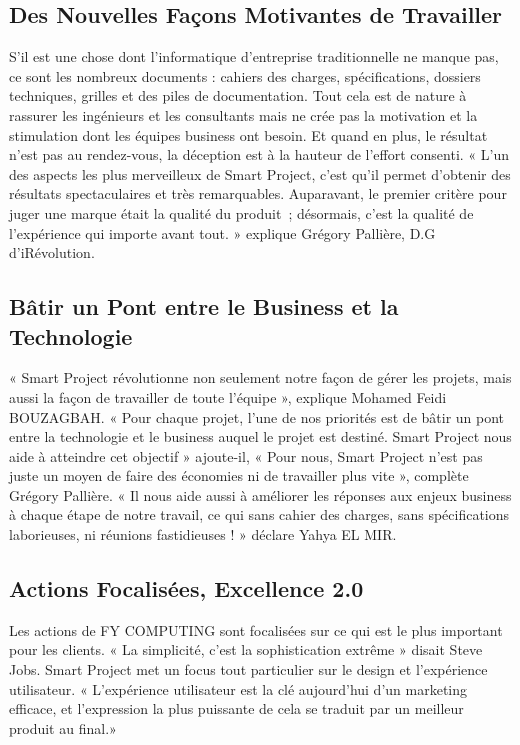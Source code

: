 \documentclass[a4paper,11pt,oneside]{report}
\begin{document}
\subsection{Des Nouvelles Façons Motivantes de Travailler}
S’il est une chose dont l’informatique d’entreprise traditionnelle ne manque pas, ce sont les nombreux documents : cahiers des charges, spécifications, dossiers techniques, grilles et des piles de documentation. Tout cela est de nature à rassurer les ingénieurs et les consultants mais ne crée pas la motivation et la stimulation dont les équipes business ont besoin. Et quand en plus, le résultat n’est pas au rendez-vous, la déception est à la hauteur de l’effort consenti. « L’un des aspects les plus merveilleux de Smart Project, c’est qu’il permet d’obtenir des résultats spectaculaires et très remarquables. Auparavant, le premier critère pour juger une marque était la qualité du produit ; désormais, c’est la qualité de l’expérience qui importe avant tout. » explique Grégory Pallière, D.G d’iRévolution.

\subsection{Bâtir un Pont entre le Business et la Technologie}
« Smart Project révolutionne non seulement notre façon de gérer les projets, mais aussi la façon de travailler de toute l’équipe », explique Mohamed Feidi BOUZAGBAH. « Pour chaque projet, l’une de nos priorités est de bâtir un pont entre la technologie et le business auquel le projet est destiné. Smart Project nous aide à atteindre cet objectif » ajoute-il, « Pour nous, Smart Project n’est pas juste un moyen de faire des économies ni de travailler plus vite », complète Grégory Pallière. « Il nous aide aussi à améliorer les réponses aux enjeux business à chaque étape de notre travail, ce qui sans cahier des charges, sans spécifications laborieuses, ni réunions fastidieuses ! » déclare Yahya EL MIR.

\subsection{Actions Focalisées, Excellence 2.0}
Les actions de FY COMPUTING sont focalisées sur ce qui est le plus important pour les clients. « La simplicité, c’est la sophistication extrême » disait Steve Jobs. Smart Project met un focus tout particulier sur le design et l’expérience utilisateur. « L’expérience utilisateur est la clé aujourd’hui d’un marketing efficace, et l’expression la plus puissante de cela se traduit par un meilleur produit au final.»
\end{document}
